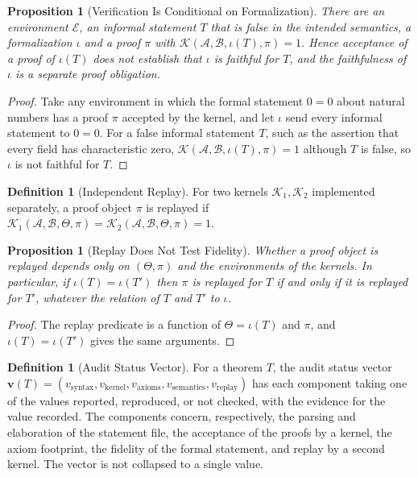 \documentclass[11pt,letterpaper]{report}
\theoremstyle{plain}
\newtheorem{proposition}[theorem]{Proposition}
\theoremstyle{definition}
\newtheorem{definition}[theorem]{Definition}
\theoremstyle{remark}
\begin{document}
\begin{proposition}[Verification Is Conditional on Formalization]\label{pr:verifcond}
There are an environment $\mathcal E$, an informal statement $T$ that is false in the intended semantics, a formalization $\iota$ and a proof $\pi$ with $\mathcal K(\mathcal A,\mathcal B,\iota(T),\pi)=1$. Hence acceptance of a proof of $\iota(T)$ does not establish that $\iota$ is faithful for $T$, and the faithfulness of $\iota$ is a separate proof obligation.
\end{proposition}
\begin{proof}
Take any environment in which the formal statement $0=0$ about natural numbers has a proof $\pi$ accepted by the kernel, and let $\iota$ send every informal statement to $0=0$. For a false informal statement $T$, such as the assertion that every field has characteristic zero, $\mathcal K(\mathcal A,\mathcal B,\iota(T),\pi)=1$ although $T$ is false, so $\iota$ is not faithful for $T$.
\end{proof}

\begin{definition}[Independent Replay]
For two kernels $\mathcal K_1,\mathcal K_2$ implemented separately, a proof object $\pi$ is replayed if $\mathcal K_1(\mathcal A,\mathcal B,\Theta,\pi)=\mathcal K_2(\mathcal A,\mathcal B,\Theta,\pi)=1$.
\end{definition}

\begin{proposition}[Replay Does Not Test Fidelity]\label{pr:replay}
Whether a proof object is replayed depends only on $(\Theta,\pi)$ and the environments of the kernels. In particular, if $\iota(T)=\iota(T')$ then $\pi$ is replayed for $T$ if and only if it is replayed for $T'$, whatever the relation of $T$ and $T'$ to $\iota$.
\end{proposition}
\begin{proof}
The replay predicate is a function of $\Theta=\iota(T)$ and $\pi$, and $\iota(T)=\iota(T')$ gives the same arguments.
\end{proof}

\begin{definition}[Audit Status Vector]\label{def:auditvec}
For a theorem $T$, the audit status vector $\mathbf v(T)=(v_{\mathrm{syntax}},v_{\mathrm{kernel}},v_{\mathrm{axioms}},v_{\mathrm{semantics}},v_{\mathrm{replay}})$ has each component taking one of the values reported, reproduced, or not checked, with the evidence for the value recorded. The components concern, respectively, the parsing and elaboration of the statement file, the acceptance of the proofs by a kernel, the axiom footprint, the fidelity of the formal statement, and replay by a second kernel. The vector is not collapsed to a single value.
\end{definition}
\end{document}
